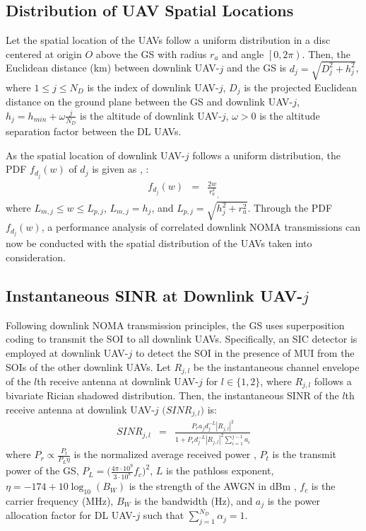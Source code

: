 \subsection{Distribution of UAV Spatial Locations}

Let the spatial location of the UAVs follow a uniform distribution in a disc centered at origin $O$ above the GS with radius $r_a$ and angle $\left[0,2\pi\right)$. Then, the Euclidean distance (km) between downlink UAV-$j$ and the GS is $d_{j}=\sqrt{D_{j}^2 + h_j^2}$, where $1 \leq j \leq N_D$ is the index of downlink UAV-$j$, $D_{j}$ is the projected Euclidean distance on the ground plane between the GS and downlink UAV-$j$, $h_j = h_{min} + \omega \frac{j}{N_D}$ is the altitude of downlink UAV-$j$, $\omega>0$ is the altitude separation factor between the DL UAVs. 

As the spatial location of downlink UAV-$j$ follows a uniform distribution, the PDF $f_{d_{j}}(w)$ of $d_{j}$ is given as \cite[eq. (3)]{chetlur2017downlink}, \cite{ernest2019hybrid}:
\begin{eqnarray}
f_{d_{j}}(w) & = & \frac{2w}{r_a^2}_,
\end{eqnarray}
where $L_{m,j} \leq w \leq L_{p,j}$, $L_{m,j} = h_j$, and $L_{p,j} = \sqrt{h_j^2+r_{a}^2}$. Through the PDF $f_{d_{j}}(w)$, a performance analysis of correlated downlink NOMA transmissions can now be conducted with the spatial distribution of the UAVs taken into consideration.

\subsection{Instantaneous SINR at Downlink UAV-$j$}
Following downlink NOMA transmission principles, the GS uses superposition coding to transmit the SOI to all downlink UAVs. Specifically, an SIC detector is employed at downlink UAV-$j$ to detect the SOI in the presence of MUI from the SOIs of the other downlink UAVs. Let $R_{j,l}$ be the instantaneous channel envelope of the $l$th receive antenna at downlink UAV-$j$ for $l \in \{1,2\}$, where $R_{j,l}$ follows a bivariate Rician shadowed distribution. Then, the instantaneous SINR of the $l$th receive antenna at downlink UAV-$j$ $\big(SINR_{j,l}\big)$ is:
\begin{eqnarray}
SINR_{j,l} & = & \frac{P_r a_{j} d_j^{-L} |R_{j,l}|^2}{1 + P_r d_j^{-L} |R_{j,l}|^2 \sum_{i=1}^{j-1} a_i}
\end{eqnarray}
where $P_r \propto \frac{P_t}{P_L \eta}$ is the normalized average received power \cite{ernest2019outage}, $P_t$ is the transmit power of the GS, $P_L = \big(\frac{4 \pi \cdot 10^9}{3 \cdot 10^8} f_c\big)^2$, $L$ is the pathloss exponent, $\eta = -174 + 10\log_{10}(B_W)$ is the strength of the AWGN in dBm \cite{hou2019exploiting}, $f_c$ is the carrier frequency (MHz), $B_W$ is the bandwidth (Hz), and $a_j$ is the power allocation factor for DL UAV-$j$ such that $\sum_{j=1}^{N_D} \alpha_j = 1$.

